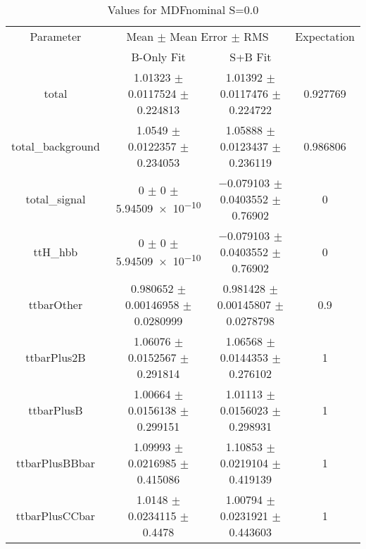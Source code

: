 \begin{table}
\centering
\caption{Values for MDFnominal S=0.0}
\begin{tabular}{cccc}
\toprule
Parameter & \multicolumn{2}{c}{Mean $\pm$ Mean Error $\pm$ RMS} & Expectation\\
 & B-Only Fit & S+B Fit & \\
\midrule
total & \num{1.01323} $\pm$ \num{0.0117524} $\pm$ \num{0.224813} & \num{1.01392} $\pm$ \num{0.0117476} $\pm$ \num{0.224722} & \num{0.927769}\\
total\_background & \num{1.0549} $\pm$ \num{0.0122357} $\pm$ \num{0.234053} & \num{1.05888} $\pm$ \num{0.0123437} $\pm$ \num{0.236119} & \num{0.986806}\\
total\_signal & \num{0} $\pm$ \num{0} $\pm$ \num{5.94509e-10} & \num{-0.079103} $\pm$ \num{0.0403552} $\pm$ \num{0.76902} & \num{0}\\
ttH\_hbb & \num{0} $\pm$ \num{0} $\pm$ \num{5.94509e-10} & \num{-0.079103} $\pm$ \num{0.0403552} $\pm$ \num{0.76902} & \num{0}\\
ttbarOther & \num{0.980652} $\pm$ \num{0.00146958} $\pm$ \num{0.0280999} & \num{0.981428} $\pm$ \num{0.00145807} $\pm$ \num{0.0278798} & \num{0.9}\\
ttbarPlus2B & \num{1.06076} $\pm$ \num{0.0152567} $\pm$ \num{0.291814} & \num{1.06568} $\pm$ \num{0.0144353} $\pm$ \num{0.276102} & \num{1}\\
ttbarPlusB & \num{1.00664} $\pm$ \num{0.0156138} $\pm$ \num{0.299151} & \num{1.01113} $\pm$ \num{0.0156023} $\pm$ \num{0.298931} & \num{1}\\
ttbarPlusBBbar & \num{1.09993} $\pm$ \num{0.0216985} $\pm$ \num{0.415086} & \num{1.10853} $\pm$ \num{0.0219104} $\pm$ \num{0.419139} & \num{1}\\
ttbarPlusCCbar & \num{1.0148} $\pm$ \num{0.0234115} $\pm$ \num{0.4478} & \num{1.00794} $\pm$ \num{0.0231921} $\pm$ \num{0.443603} & \num{1}\\
\bottomrule
\end{tabular}
\end{table}